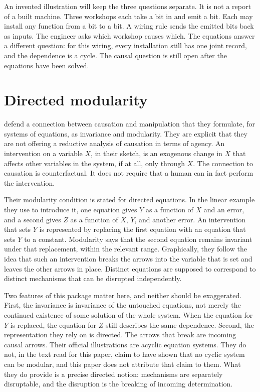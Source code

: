 \documentclass[11pt]{article}
\begin{document}
An invented illustration will keep the three questions separate. It is not a report of a built machine. Three workshops each take a bit in and emit a bit. Each may install any function from a bit to a bit. A wiring rule sends the emitted bits back as inputs. The engineer asks which workshop causes which. The equations answer a different question: for this wiring, every installation still has one joint record, and the dependence is a cycle. The causal question is still open after the equations have been solved.

\section{Directed modularity}
\label{sec:hw}

\citet{hausman1999} defend a connection between causation and manipulation that they formulate, for systems of equations, as invariance and modularity. They are explicit that they are not offering a reductive analysis of causation in terms of agency. An intervention on a variable \(X\), in their sketch, is an exogenous change in \(X\) that affects other variables in the system, if at all, only through \(X\). The connection to causation is counterfactual. It does not require that a human can in fact perform the intervention.

Their modularity condition is stated for directed equations. In the linear example they use to introduce it, one equation gives \(Y\) as a function of \(X\) and an error, and a second gives \(Z\) as a function of \(X\), \(Y\), and another error. An intervention that sets \(Y\) is represented by replacing the first equation with an equation that sets \(Y\) to a constant. Modularity says that the second equation remains invariant under that replacement, within the relevant range. Graphically, they follow the idea that such an intervention breaks the arrows into the variable that is set and leaves the other arrows in place. Distinct equations are supposed to correspond to distinct mechanisms that can be disrupted independently.

Two features of this package matter here, and neither should be exaggerated. First, the invariance is invariance of the untouched equations, not merely the continued existence of some solution of the whole system. When the equation for \(Y\) is replaced, the equation for \(Z\) still describes the same dependence. Second, the representation they rely on is directed. The arrows that break are incoming causal arrows. Their official illustrations are acyclic equation systems. They do not, in the text read for this paper, claim to have shown that no cyclic system can be modular, and this paper does not attribute that claim to them. What they do provide is a precise directed notion: mechanisms are separately disruptable, and the disruption is the breaking of incoming determination.
\end{document}

